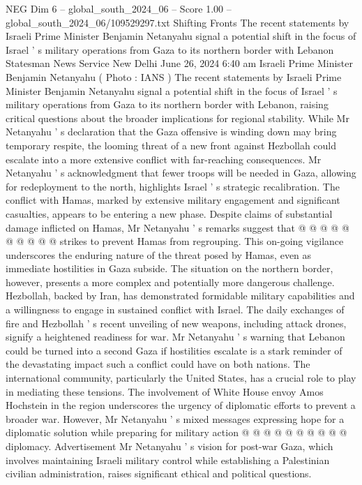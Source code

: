 \begin{textsample}{NEG Dim 6 – global\_south\_2024\_06 – Score 1.00 – global\_south\_2024\_06/109529297.txt}  \label{ex:f6_neg_272}
Shifting Fronts The recent statements by Israeli Prime Minister Benjamin Netanyahu signal a potential shift in the focus of Israel ' s military operations from Gaza to its northern border with Lebanon Statesman News Service New Delhi June 26, 2024 6:40 am Israeli Prime Minister Benjamin Netanyahu ( Photo : IANS ) The recent statements by Israeli Prime Minister Benjamin Netanyahu signal a potential shift in the focus of Israel ' s military operations from Gaza to its northern border with Lebanon, raising critical questions about the broader implications for regional stability.
While Mr Netanyahu ' s declaration that the Gaza offensive is winding down may bring temporary respite, the looming threat of a new front against Hezbollah could escalate into a more extensive conflict with far-reaching consequences.
Mr Netanyahu ' s acknowledgment that fewer troops will be needed in Gaza, allowing for redeployment to the north, highlights Israel ' s strategic recalibration.
The conflict with Hamas, marked by extensive military engagement and significant casualties, appears to be entering a new phase.
Despite claims of substantial damage inflicted on Hamas, Mr Netanyahu ' s remarks suggest that @ @ @ @ @ @ @ @ @ @ strikes to prevent Hamas from regrouping.
This on-going vigilance underscores the enduring nature of the threat posed by Hamas, even as immediate hostilities in Gaza subside.
The situation on the northern border, however, presents a more complex and potentially more dangerous challenge.
Hezbollah, backed by Iran, has demonstrated formidable military capabilities and a willingness to engage in sustained conflict with Israel.
The daily exchanges of fire and Hezbollah ' s recent unveiling of new weapons, including attack drones, signify a heightened readiness for war.
Mr Netanyahu ' s warning that Lebanon could be turned into a second Gaza if hostilities escalate is a stark reminder of the devastating impact such a conflict could have on both nations.
The international community, particularly the United States, has a crucial role to play in mediating these tensions.
The involvement of White House envoy Amos Hochstein in the region underscores the urgency of diplomatic efforts to prevent a broader war.
However, Mr Netanyahu ' s mixed messages expressing hope for a diplomatic solution while preparing for military action @ @ @ @ @ @ @ @ @ @ diplomacy.
Advertisement Mr Netanyahu ' s vision for post-war Gaza, which involves maintaining Israeli military control while establishing a Palestinian civilian administration, raises significant ethical and political questions.

\end{textsample}
